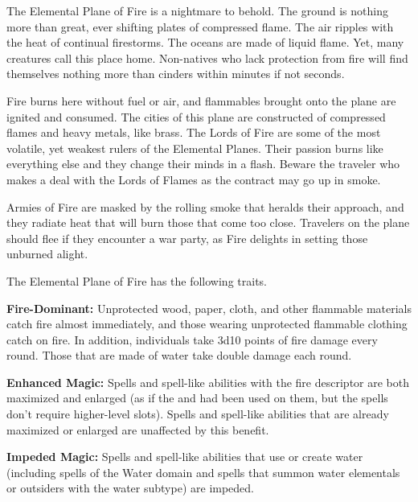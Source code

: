 The Elemental Plane of Fire is a nightmare to behold. The ground is nothing more than great, ever shifting plates of compressed flame. The air ripples with the heat of continual firestorms. The oceans are made of liquid flame. Yet, many creatures call this place home. Non-natives who lack protection from fire will find themselves nothing more than cinders within minutes if not seconds.

Fire burns here without fuel or air, and flammables brought onto the plane are ignited and consumed. The cities of this plane are constructed of compressed flames and heavy metals, like brass. The Lords of Fire are some of the most volatile, yet weakest rulers of the Elemental Planes. Their passion burns like everything else and they change their minds in a flash. Beware the traveler who makes a deal with the Lords of Flames as the contract may go up in smoke.

Armies of Fire are masked by the rolling smoke that heralds their approach, and they radiate heat that will burn those that come too close. Travelers on the plane should flee if they encounter a war party, as Fire delights in setting those unburned alight.

The Elemental Plane of Fire has the following traits.
\begin{itemize*}
\item \textbf{Fire-Dominant:} Unprotected wood, paper, cloth, and other flammable materials catch fire almost immediately, and those wearing unprotected flammable clothing catch on fire. In addition, individuals take 3d10 points of fire damage every round. Those that are made of water take double damage each round.
\item \textbf{Enhanced Magic:} Spells and spell-like abilities  with the fire descriptor are both maximized and enlarged (as if the  and  had been used on them, but the spells don't require higher-level slots). Spells and spell-like abilities that are already maximized or enlarged are unaffected by this benefit.
\item \textbf{Impeded Magic:} Spells and spell-like abilities that use or create water (including spells of the Water domain and spells that summon water elementals or outsiders with the water subtype) are impeded.
\end{itemize*}
